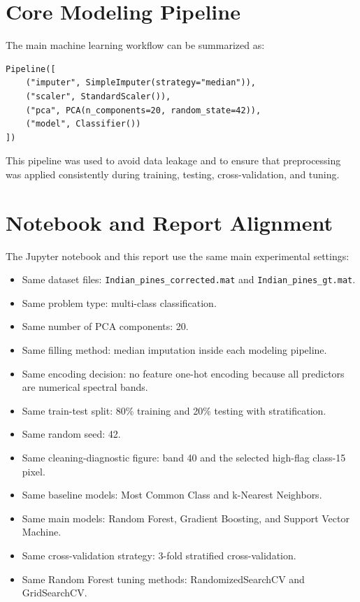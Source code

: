 \documentclass[12pt,a4paper]{article}
\begin{document}
\section{Core Modeling Pipeline}

The main machine learning workflow can be summarized as:

\begin{verbatim}
Pipeline([
    ("imputer", SimpleImputer(strategy="median")),
    ("scaler", StandardScaler()),
    ("pca", PCA(n_components=20, random_state=42)),
    ("model", Classifier())
])
\end{verbatim}

This pipeline was used to avoid data leakage and to ensure that preprocessing was applied consistently during training, testing, cross-validation, and tuning.

\section{Notebook and Report Alignment}

The Jupyter notebook and this report use the same main experimental settings:

\begin{itemize}
    \item Same dataset files: \texttt{Indian\_pines\_corrected.mat} and \texttt{Indian\_pines\_gt.mat}.
    \item Same problem type: multi-class classification.
    \item Same number of PCA components: 20.
    \item Same filling method: median imputation inside each modeling pipeline.
    \item Same encoding decision: no feature one-hot encoding because all predictors are numerical spectral bands.
    \item Same train-test split: 80\% training and 20\% testing with stratification.
    \item Same random seed: 42.
    \item Same cleaning-diagnostic figure: band 40 and the selected high-flag class-15 pixel.
    \item Same baseline models: Most Common Class and k-Nearest Neighbors.
    \item Same main models: Random Forest, Gradient Boosting, and Support Vector Machine.
    \item Same cross-validation strategy: 3-fold stratified cross-validation.
    \item Same Random Forest tuning methods: RandomizedSearchCV and GridSearchCV.
\end{itemize}
\end{document}
